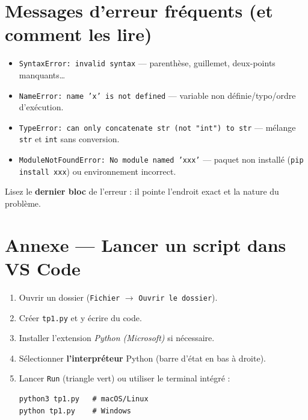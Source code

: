 \documentclass[11pt,a4paper]{article}
\begin{document}
\section*{Messages d'erreur fréquents (et comment les lire)}
\begin{itemize}
  \item \texttt{SyntaxError: invalid syntax} — parenthèse, guillemet, deux-points manquants\dots
  \item \texttt{NameError: name 'x' is not defined} — variable non définie/typo/ordre d'exécution.
  \item \texttt{TypeError: can only concatenate str (not "int") to str} — mélange \texttt{str} et \texttt{int} sans conversion.
  \item \texttt{ModuleNotFoundError: No module named 'xxx'} — paquet non installé (\texttt{pip install xxx}) ou environnement incorrect.
\end{itemize}
\begin{AstuceBox}
Lisez le \textbf{dernier bloc} de l’erreur : il pointe l’endroit exact et la nature du problème.
\end{AstuceBox}

\section*{Annexe — Lancer un script dans VS Code}
\begin{enumerate}
  \item Ouvrir un dossier (\texttt{Fichier} $\rightarrow$ \texttt{Ouvrir le dossier}).
  \item Créer \texttt{tp1.py} et y écrire du code.
  \item Installer l’extension \textit{Python (Microsoft)} si nécessaire.
  \item Sélectionner \textbf{l’interpréteur} Python (barre d’état en bas à droite).
  \item Lancer \texttt{Run} (triangle vert) ou utiliser le terminal intégré :
\begin{lstlisting}[language=terminal]
python3 tp1.py   # macOS/Linux
python tp1.py    # Windows
\end{lstlisting}
\end{enumerate}
\end{document}
